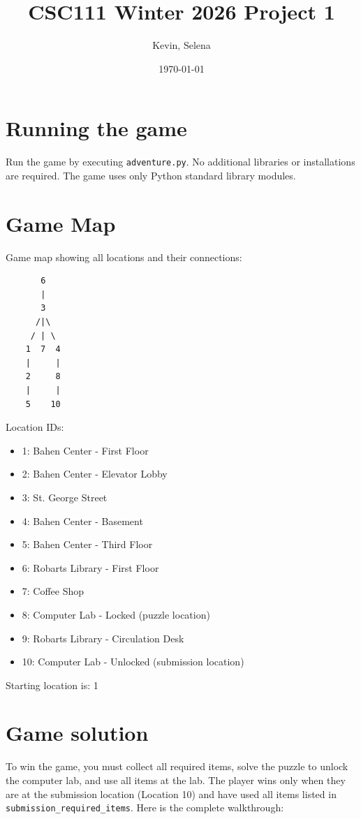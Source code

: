 \documentclass[11pt]{article}
\title{CSC111 Winter 2026 Project 1}
\author{Kevin, Selena}
\date{\today}
\begin{document}
\maketitle

\section*{Running the game}
Run the game by executing \texttt{adventure.py}. No additional libraries or installations are required. The game uses only Python standard library modules.

\section*{Game Map}
Game map showing all locations and their connections:

\begin{verbatim}
       6
       |
       3
      /|\
     / | \
    1  7  4
    |     |
    2     8
    |     |
    5    10
\end{verbatim}

Location IDs:
\begin{itemize}
    \item 1: Bahen Center - First Floor
    \item 2: Bahen Center - Elevator Lobby
    \item 3: St. George Street
    \item 4: Bahen Center - Basement
    \item 5: Bahen Center - Third Floor
    \item 6: Robarts Library - First Floor
    \item 7: Coffee Shop
    \item 8: Computer Lab - Locked (puzzle location)
    \item 9: Robarts Library - Circulation Desk
    \item 10: Computer Lab - Unlocked (submission location)
\end{itemize}

Starting location is: 1

\section*{Game solution}
To win the game, you must collect all required items, solve the puzzle to unlock the computer lab, and use all items at the lab. The player wins only when they are at the submission location (Location 10) and have used all items listed in \verb|submission_required_items|. Here is the complete walkthrough:
\end{document}
